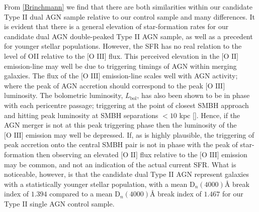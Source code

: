 From \ref{Brinchmann} we find that there are both similarities within our candidate Type II dual AGN sample relative to our control sample and many differences. It is evident that there is a general elevation of star-formation rates for our candidate dual AGN double-peaked Type II AGN sample, as well as a precedent for younger stellar populations. However, the SFR has no real relation to the level of OII relative to the $\text{[O III]}$ flux. This perceived elevation in the $\text{[O II]}$ emission-line may well be due to triggering timings of AGN within merging galaxies. The flux of the $\text{[O III]}$ emission-line scales well with AGN activity; where the peak of AGN accretion should correspond to the peak $\text{[O III]}$ luminosity. The bolometric luminosity, $L_{\text{bol}}$, has also been shown to be in phase with each pericentre passage; triggering at the point of closest SMBH approach and hitting peak luminosity at SMBH separations $<{10}$ kpc [\cite{Van_Wassenhove_2012}]. Hence, if the AGN merger is not at this peak triggering phase then the luminosity of the $\text{[O III]}$ emission may well be depressed. If, as is highly plausible, the triggering of peak accretion onto the central SMBH pair is not in phase with the peak of star-formation then observing an elevated $\text{[O II]}$ flux relative to the $\text{[O III]}$ emission may be common, and not an indication of the actual current SFR. What is noticeable, however, is that the candidate dual Type II AGN represent galaxies with a statistically younger stellar population, with a mean $\text{D}_{n}(4000)Å$ break index of $1.394$ compared to a mean $\text{D}_{n}(4000)Å$ break index of $1.467$ for our Type II single AGN control sample.     

